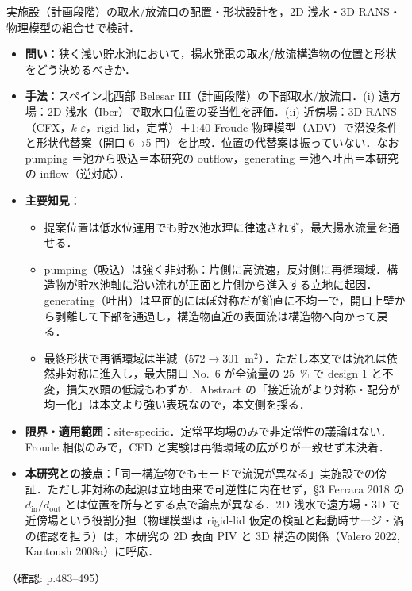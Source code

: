 \documentclass[11pt]{jsarticle}
\newcommand{\litref}[1]{{\large\bfseries\color{citecolor}#1}}
\begin{document}
\noindent\litref{Berm\'udez et al. (2017)}\quad 実施設（計画段階）の取水/放流口の配置・形状設計を，2D 浅水・3D RANS・物理模型の組合せで検討．
\begin{itemize}
  \item \textbf{問い}：狭く浅い貯水池において，揚水発電の取水/放流構造物の位置と形状をどう決めるべきか．
  \item \textbf{手法}：スペイン北西部 Belesar III（計画段階）の下部取水/放流口．(i) 遠方場：2D 浅水（Iber）で取水口位置の妥当性を評価．(ii) 近傍場：3D RANS（CFX，$k$-$\varepsilon$，rigid-lid，定常）＋1:40 Froude 物理模型（ADV）で潜没条件と形状代替案（開口 6→5 門）を比較．位置の代替案は振っていない．なお pumping ＝池から吸込＝本研究の outflow，generating ＝池へ吐出＝本研究の inflow（逆対応）．
  \item \textbf{主要知見}：
  \begin{itemize}
    \item 提案位置は低水位運用でも貯水池水理に律速されず，最大揚水流量を通せる．
    \item pumping（吸込）は強く非対称：片側に高流速，反対側に再循環域．構造物が貯水池軸に沿い流れが正面と片側から進入する立地に起因．generating（吐出）は平面的にほぼ対称だが鉛直に不均一で，開口上壁から剥離して下部を通過し，構造物直近の表面流は構造物へ向かって戻る．
    \item 最終形状で再循環域は半減（$572 \to 301$~$\mathrm{m}^2$）．ただし本文では流れは依然非対称に進入し，最大開口 No.~6 が全流量の 25~\% で design 1 と不変，損失水頭の低減もわずか．Abstract の「接近流がより対称・配分が均一化」は本文より強い表現なので，本文側を採る．
  \end{itemize}
  \item \textbf{限界・適用範囲}：site-specific．定常平均場のみで非定常性の議論はない．Froude 相似のみで，CFD と実験は再循環域の広がりが一致せず未決着．
  \item \textbf{本研究との接点}：「同一構造物でもモードで流況が異なる」実施設での傍証．ただし非対称の起源は立地由来で可逆性に内在せず，§3 Ferrara 2018 の $d_\mathrm{in}/d_\mathrm{out}$ とは位置を所与とする点で論点が異なる．2D 浅水で遠方場・3D で近傍場という役割分担（物理模型は rigid-lid 仮定の検証と起動時サージ・渦の確認を担う）は，本研究の 2D 表面 PIV と 3D 構造の関係（Valero 2022, Kantoush 2008a）に呼応．
\end{itemize}
\noindent（確認: p.483--495）
\end{document}
